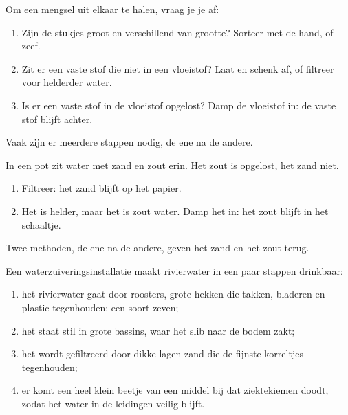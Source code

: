 \begin{method}\label{met:g3:separating-mixtures:choose}
Om een mengsel uit elkaar te halen, vraag je je af:
\begin{enumerate}
  \item Zijn de stukjes groot en verschillend van grootte? Sorteer met
        de hand, of zeef.
  \item Zit er een vaste stof die niet  in een vloeistof? Laat
         en schenk af, of filtreer voor helderder water.
  \item Is er een vaste stof in de vloeistof opgelost? Damp de vloeistof
        in: de vaste stof blijft achter.
\end{enumerate}
Vaak zijn er meerdere stappen nodig, de ene na de andere.
\end{method}

\begin{example}\label{ex:g3:separating-mixtures:three}
In een pot zit water met zand en zout erin. Het zout is opgelost, het
zand niet.
\begin{enumerate}
  \item Filtreer: het zand blijft op het papier.
  \item Het  is helder, maar het is zout water. Damp het in: het
        zout blijft in het schaaltje.
\end{enumerate}
Twee methoden, de ene na de andere, geven het zand en het zout terug.
\end{example}

\begin{example}\label{ex:g3:separating-mixtures:plant}
Een waterzuiveringsinstallatie maakt rivierwater in een paar stappen
drinkbaar:
\begin{enumerate}
  \item het rivierwater gaat door roosters, grote hekken die takken,
        bladeren en plastic tegenhouden: een soort zeven;
  \item het staat stil in grote bassins, waar het slib naar de bodem
        zakt;
  \item het wordt gefiltreerd door dikke lagen zand die de fijnste
        korreltjes tegenhouden;
  \item er komt een heel klein beetje van een middel bij dat ziektekiemen
        doodt, zodat het water in de leidingen veilig blijft.
\end{enumerate}
\end{example}

